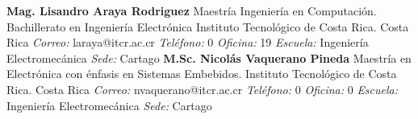 \documentclass[letterpaper]{article}%
\newenvironment{textoMargen}
    {%
    \begin{list}{}{%
        \setlength{\leftmargin}{3.6cm}%
        \setlength{\rightmargin}{1.1cm}%
    }%
    \item[]%
  }
  {%
    \end{list}%
  }
\begin{document}
\vspace*{-4mm}\begin{textoMargen}\textbf{Mag. Lisandro Araya Rodriguez} \newline Maestría Ingeniería en Computación. Bachillerato en Ingeniería Electrónica Instituto Tecnológico de Costa Rica. Costa Rica \newline \newline \emph{Correo:} laraya@itcr.ac.cr\emph{  Teléfono:} 0 \vspace*{1mm} \newline \emph{  Oficina:} 19\emph{  Escuela:} Ingeniería Electromecánica\emph{  Sede:} Cartago \vspace*{4mm} \newline \textbf{M.Sc. Nicolás Vaquerano Pineda} \newline Maestría en Electrónica con énfasis en Sistemas Embebidos. Instituto Tecnológico de Costa Rica. Costa Rica \newline \newline \emph{Correo:} nvaquerano@itcr.ac.cr\emph{  Teléfono:} 0 \vspace*{1mm} \newline \emph{  Oficina:} 0\emph{  Escuela:} Ingeniería Electromecánica\emph{  Sede:} Cartago \vspace*{4mm} \newline \end{textoMargen}%
\end{document}
